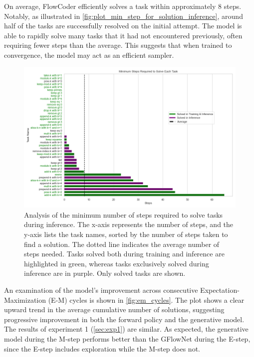 On average, FlowCoder efficiently solves a task within approximately 8 steps. Notably, as illustrated in \autoref{fig:plot_min_step_for_solution_inference}, around half of the tasks are successfully resolved on the initial attempt. The model is able to rapidly solve many tasks that it had not encountered previously, often requiring fewer steps than the average. This suggests that when trained to convergence, the model may act as an efficient sampler.

\begin{figure}[H]
    \centering
    \includegraphics[width=\textwidth]{../img/plot_min_step_for_solution_inference_depth_3_48_tasks2023-12-07 22:24:45_inference.png}
    \caption{Analysis of the minimum number of steps required to solve tasks during inference. The x-axis represents the number of steps, and the y-axis lists the task names, sorted by the number of steps taken to find a solution. The dotted line indicates the average number of steps needed. Tasks solved both during training and inference are highlighted in green, whereas tasks exclusively solved during inference are in purple. Only solved tasks are shown.}
    \label{fig:plot_min_step_for_solution_inference}
\end{figure}

An examination of the model's improvement across consecutive Expectation-Maximization (E-M) cycles is shown in \autoref{fig:em_cycles}. The plot shows a clear upward trend in the average cumulative number of solutions, suggesting progressive improvement in both the forward policy and the generative model. The results of experiment 1 (\autoref{sec:exp1}) are similar. As expected, the generative model during the M-step performs better than the GFlowNet during the E-step, since the E-step includes exploration while the M-step does not.

